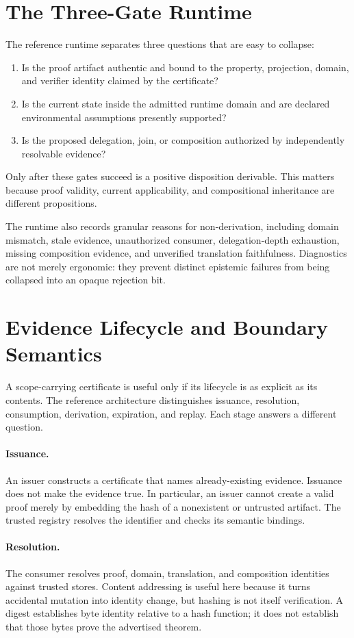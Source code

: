 \documentclass[11pt]{article}
\begin{document}
\section{The Three-Gate Runtime}
The reference runtime separates three questions that are easy to collapse:
\begin{enumerate}[label=\arabic*.]
\item Is the proof artifact authentic and bound to the property, projection, domain, and verifier identity claimed by the certificate?
\item Is the current state inside the admitted runtime domain and are declared environmental assumptions presently supported?
\item Is the proposed delegation, join, or composition authorized by independently resolvable evidence?
\end{enumerate}
Only after these gates succeed is a positive disposition derivable. This matters because proof validity, current applicability, and compositional inheritance are different propositions.

The runtime also records granular reasons for non-derivation, including domain mismatch, stale evidence, unauthorized consumer, delegation-depth exhaustion, missing composition evidence, and unverified translation faithfulness. Diagnostics are not merely ergonomic: they prevent distinct epistemic failures from being collapsed into an opaque rejection bit.

\section{Evidence Lifecycle and Boundary Semantics}
A scope-carrying certificate is useful only if its lifecycle is as explicit as its contents. The reference architecture distinguishes issuance, resolution, consumption, derivation, expiration, and replay. Each stage answers a different question.

\paragraph{Issuance.} An issuer constructs a certificate that names already-existing evidence. Issuance does not make the evidence true. In particular, an issuer cannot create a valid proof merely by embedding the hash of a nonexistent or untrusted artifact. The trusted registry resolves the identifier and checks its semantic bindings.

\paragraph{Resolution.} The consumer resolves proof, domain, translation, and composition identities against trusted stores. Content addressing is useful here because it turns accidental mutation into identity change, but hashing is not itself verification. A digest establishes byte identity relative to a hash function; it does not establish that those bytes prove the advertised theorem.
\end{document}
